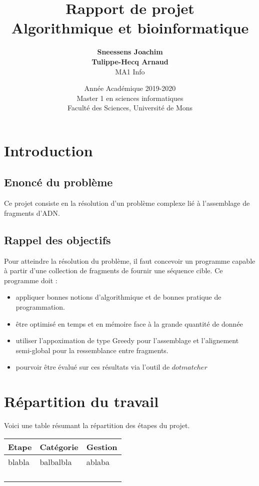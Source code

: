 \documentclass{article}
\title{
{\Huge \textbf{Rapport de projet}\\
Algorithmique et bioinformatique}}
\author{\textbf{Sneessens Joachim}\\\textbf{Tulippe-Hecq Arnaud}\\MA1 Info}
\date{Année Académique 2019-2020\\
Master 1 en sciences informatiques\\
\vspace{1cm}
Faculté des Sciences, Université de Mons}
\begin{document}
\maketitle

\newpage

\section{Introduction}

\subsection{Enoncé du problème}

Ce projet consiste en la résolution d'un problème complexe lié à l'assemblage de fragments d'ADN.

\subsection{Rappel des objectifs}

Pour atteindre la résolution du problème, il faut concevoir un programme capable  à partir d'une collection de fragments de fournir une séquence cible. Ce programme doit :
\vspace{0.5cm}
\begin{itemize}
\item appliquer bonnes notions d'algorithmique et de bonnes pratique de programmation.
\item être optimisé en temps et en mémoire face à la grande quantité de donnée
\item utiliser l'appoximation de type Greedy pour l'assemblage et l'alignement semi-global pour la ressemblance entre fragments.
\item pourvoir être évalué sur ces résultats via l'outil de $dotmatcher$
\end{itemize} 

\section{Répartition du travail}

Voici une table résumant la répartition des étapes du projet.

\begin{table}[!htbp]
\begin{center}
\begin{tabular}{|p{3cm}||p{2.5cm}|p{3cm}|}
\hline
\textbf{Etape} & Catégorie & Gestion\\
\hline\hline
blabla & balbalbla & ablaba\\
\hline
\\
\hline
\\
\hline
\\
\hline
\\
\hline
\end{tabular}
\end{center}
\end{table}
\end{document}

